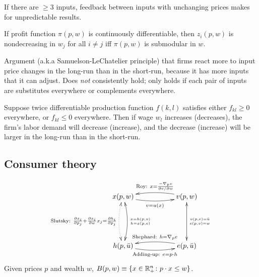 \documentclass[8pt,letterpaper, landscape]{extarticle} %
\begin{document}
\begin{multicols}{3}
\begin{description}
If there are $ \geq 3 $ inputs, feedback between inputs with unchanging prices makes for unpredictable results.

If profit function $ \pi (p,w) $ is continuously differentiable, then $ z_i(p, w) $ is nondecreasing in $ w_j $ for all $ i \neq j $ iff $ \pi(p,w) $ is submodular in $ w $.

 Argument (a.k.a Samuelson-LeChatelier principle) that firms react more to input price changes in the long-run than in the short-run, because it has more inputs that it can adjust. Does \textit{not} consistently hold; only holds if each pair of inputs are substitutes everywhere or complements everywhere.

Suppose twice differentiable production function $ f(k,l) $ satisfies either $ f_{kl} \geq 0 $ everywhere, or $ f_{kl} \leq 0 $ everywhere. Then if wage $ w_{l} $ increases (decreases), the firm's labor demand will decrease (increase), and the decrease (increase) will be larger in the long-run than in the short-run.

\subsection{Consumer theory}
\begin{displaymath}
\xymatrix{
x(p,w) \ar@/_/[rr]_{v = u(x)} \ar@/^/@{<->}[dd]^{\genfrac{}{}{0pt}{}{x = h(p,v)}{h = x(p,e)}} &&
v(p,w) \ar@/_/[ll]_{\text{Roy: } x = \frac{- \nabla_p v}{\partial v / \partial w}} \ar@{<->}[dd]^{\genfrac{}{}{0pt}{}{v(p,e) = \bar{u}}{e(p,v) = w}} \\
&& \\
h(p,\bar{u}) \ar@/_/[rr]_{\text{Adding-up: } e = p \cdot h} \ar@/^/@{<.>}[uu]^{\text{Slutsky: }\frac{\partial x_i}{\partial p_j} + \frac{\partial x_i}{\partial w} x_j = \frac{\partial h_i}{\partial p_j}} &&
e(p,\bar{u}) \ar@/_/[ll]_{\text{Shephard: } h = \nabla_p e }
}
\end{displaymath}
 Given prices $ p $ and wealth $ w $, $ B(p,w) \equiv \{ x \in \mathbb{R}^{n}_{+} \colon p \cdot x \leq w \} $.


\end{description}
\end{multicols}
\end{document}
